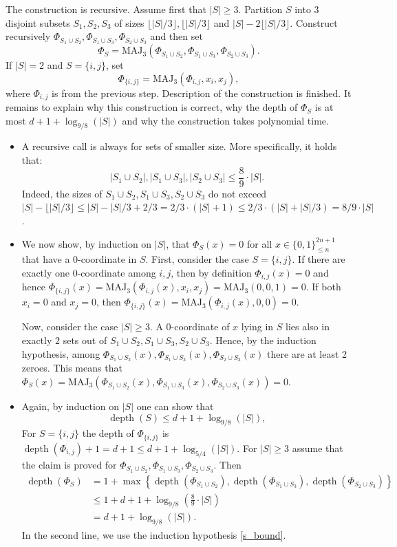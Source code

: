 \documentclass[11pt]{article}
\numberwithin{equation}{section}
\theoremstyle{definition}
\theoremstyle{plain}
\def\MAJ{\mathrm{MAJ}}
\DeclareMathOperator{\depth}{depth}  %
\begin{document}
The construction is recursive. Assume first that $|S| \ge 3$. Partition $S$ into $3$ disjoint subsets $S_1, S_2, S_3$ of sizes $\lfloor |S|/3\rfloor, \lfloor |S|/3\rfloor$ and $|S| - 2\lfloor |S|/3\rfloor$. 
 Construct recursively $\Phi_{S_1\cup S_2}, \Phi_{S_1 \cup S_3}, \Phi_{S_2\cup S_3}$ and then set
\[\Phi_S = \MAJ_3\left(\Phi_{S_1\cup S_2}, \Phi_{S_1\cup S_3}, \Phi_{S_2\cup S_3}\right).\]
If $|S| = 2$ and $S = \{i, j\}$, set
\[\Phi_{\{i, j\}} = \MAJ_3(\Phi_{i,j}, x_i, x_j),\]
where $\Phi_{i,j}$ is from the previous step.
Description of the construction is finished. It remains to explain why this construction is correct, why the depth of $\Phi_S$ is at most  $d + 1 + \log_{9/8}(|S|)$ and why the construction takes polynomial time.

\begin{itemize}
\item A recursive call is always for sets of smaller size. More specifically, it holds that:
\begin{equation}
\label{s_bound}
|S_1\cup S_2|, |S_1\cup S_3|, |S_2\cup S_3| \le \frac{8}{9} \cdot |S|.
\end{equation}
Indeed, the sizes of $S_1\cup S_2, S_1\cup S_3, S_2\cup S_3$ do not exceed $|S| - \lfloor|S|/3\rfloor \le |S| - |S|/3 + 2/3 = 2/3\cdot(|S| + 1) \le 2/3\cdot (|S| + |S|/3) = 8/9\cdot |S|$.

\item We now show, by induction on $|S|$, that $\Phi_S(x) = 0$ for all $x\in\{0, 1\}^{2n + 1}_{\le n}$ that have a $0$-coordinate in $S$. First, consider the case $S = \{i, j\}$. If there are exactly one $0$-coordinate among $i, j$, then by definition $\Phi_{i, j}(x) = 0$ and hence $\Phi_{\{i, j\}}(x) = \MAJ_3(\Phi_{i,j}(x), x_i, x_j) = \MAJ_3(0, 0, 1) = 0$. If both $x_i = 0$ and $x_j = 0$, then $\Phi_{\{i, j\}}(x) = \MAJ_3(\Phi_{i,j}(x), 0, 0) = 0$.

Now, consider the case $|S| \ge 3$. A $0$-coordinate of $x$ lying  in $S$ lies also in exactly $2$ sets out of $S_1\cup S_2, S_1\cup S_3, S_2\cup S_3$. Hence,  by the induction hypothesis, among $\Phi_{S_1\cup S_2}(x), \Phi_{S_1\cup S_3}(x), \Phi_{S_2\cup S_3}(x)$ there are at least 2 zeroes. This means that $\Phi_S(x) = \MAJ_3\left(\Phi_{S_1\cup S_2}(x), \Phi_{S_1\cup S_3}(x), \Phi_{S_2\cup S_3}(x)\right) = 0$.

\item Again, by induction on $|S|$ one can show that
\[\depth(S) \le d + 1 + \log_{9/8}(|S|),\]
 For $S = \{i,j\}$ the depth of $\Phi_{\{i,j\}}$ is $\depth(\Phi_{i,j}) + 1 = d + 1 \le d + 1 + \log_{5/4}(|S|)$. For $|S| \ge 3$ assume that the claim is proved for $\Phi_{S_1\cup S_2}, \Phi_{S_1 \cup S_3}, \Phi_{S_2\cup S_3}$. Then
\begin{align*}
\depth(\Phi_S) &= 1 + \max\left\{\depth(\Phi_{S_1\cup S_2}), \depth(\Phi_{S_1\cup S_3}), \depth(\Phi_{S_2\cup S_3})\right\} \\
&\le 1 + d + 1 + \log_{9/8}\left(\frac{8}{9} \cdot |S|\right) \\
&= d + 1 + \log_{9/8}(|S|).
\end{align*}
In the second line, we use the induction hypothesis \eqref{s_bound}.


\end{itemize}
\end{document}
